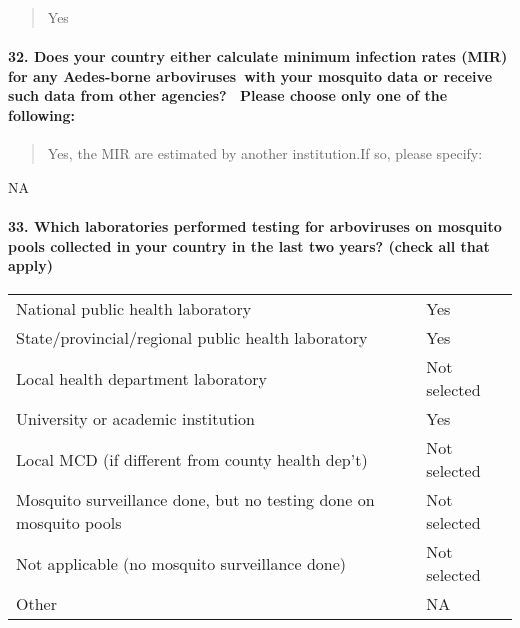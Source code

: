 \documentclass[
]{article}
\begin{document}
\begin{quote}
Yes
\end{quote}

\hypertarget{does-your-country-either-calculate-minimum-infection-rates-mir-for-any-aedes-borne-arboviruses-with-your-mosquito-data-or-receive-such-data-from-other-agencies-please-choose-only-one-of-the-following}{%
\paragraph{32. Does your country either calculate minimum infection
rates (MIR) for any Aedes-borne arboviruses~with your mosquito data or
receive such data from other agencies?~ Please choose only one of the
following:}\label{does-your-country-either-calculate-minimum-infection-rates-mir-for-any-aedes-borne-arboviruses-with-your-mosquito-data-or-receive-such-data-from-other-agencies-please-choose-only-one-of-the-following}}

\begin{quote}
Yes, the MIR are estimated by another institution.If so, please specify:
\end{quote}

NA

\hypertarget{which-laboratories-performed-testing-for-arboviruses-on-mosquito-pools-collected-in-your-country-in-the-last-two-years-check-all-that-apply}{%
\paragraph{33. Which laboratories performed testing for arboviruses on
mosquito pools collected in your country in the last two years? (check
all that
apply)}\label{which-laboratories-performed-testing-for-arboviruses-on-mosquito-pools-collected-in-your-country-in-the-last-two-years-check-all-that-apply}}

\begin{longtable}[]{@{}
  >{\raggedright\arraybackslash}p{}
  >{\raggedright\arraybackslash}p{}@{}}
\toprule
\endhead
National public health laboratory & Yes \\
State/provincial/regional public health laboratory & Yes \\
Local health department laboratory & Not selected \\
University or academic institution & Yes \\
Local MCD (if different from county health dep't) & Not selected \\
Mosquito surveillance done, but no testing done on mosquito pools & Not
selected \\
Not applicable (no mosquito surveillance done) & Not selected \\
Other & NA \\
\bottomrule
\end{longtable}
\end{document}
